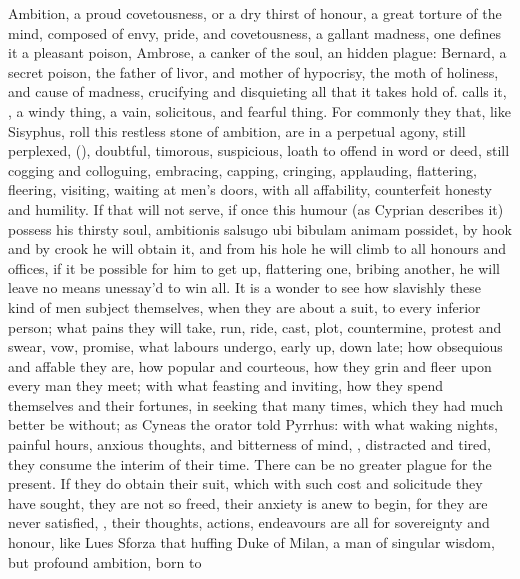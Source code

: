 {Ambition, a proud covetousness, or a dry thirst of honour, a great
torture of the mind, composed of envy, pride, and covetousness, a
gallant madness, one defines it a pleasant poison, Ambrose, a
canker of the soul, an hidden plague: Bernard, a secret poison,
the father of livor, and mother of hypocrisy, the moth of holiness, and
cause of madness, crucifying and disquieting all that it takes hold of.
\Seneca calls it, , a windy
thing, a vain, solicitous, and fearful thing. For commonly they that,
like Sisyphus, roll this restless stone of ambition, are in a perpetual
agony, still perplexed, 
(\Lucretius{}), doubtful, timorous, suspicious, loath to offend in word or
deed, still cogging and colloguing, embracing, capping, cringing,
applauding, flattering, fleering, visiting, waiting at men's doors,
with all affability, counterfeit honesty and humility. If that
will not serve, if once this humour (as Cyprian describes it)
possess his thirsty soul, ambitionis salsugo ubi bibulam animam
possidet, by hook and by crook he will obtain it, and from his hole he
will climb to all honours and offices, if it be possible for him to get
up, flattering one, bribing another, he will leave no means unessay'd
to win all. It is a wonder to see how slavishly these kind of men
subject themselves, when they are about a suit, to every inferior
person; what pains they will take, run, ride, cast, plot, countermine,
protest and swear, vow, promise, what labours undergo, early up, down
late; how obsequious and affable they are, how popular and courteous,
how they grin and fleer upon every man they meet; with what feasting
and inviting, how they spend themselves and their fortunes, in seeking
that many times, which they had much better be without; as Cyneas
the orator told Pyrrhus: with what waking nights, painful hours,
anxious thoughts, and bitterness of mind, ,
distracted and tired, they consume the interim of their time. There can
be no greater plague for the present. If they do obtain their suit,
which with such cost and solicitude they have sought, they are not so
freed, their anxiety is anew to begin, for they are never satisfied,
, their thoughts, actions, endeavours
are all for sovereignty and honour, like Lues Sforza that huffing
Duke of Milan, a man of singular wisdom, but profound ambition, born to
}
